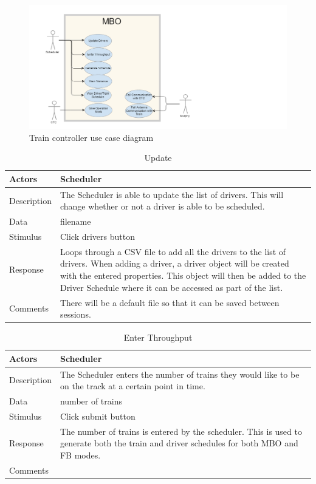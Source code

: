 \documentclass[]{article}
\begin{document}
\begin{figure}[H]
	\centering
	\includegraphics[scale=.2]{mbousecase.png}
	\caption{Train controller use case diagram}
\end{figure}
\begin{table}[H]
	\centering
	\caption{Update}
	\begin{tabular}{|l|l|}
		\hline
		Actors & \parbox[t]{10cm}{Scheduler} \\ \hline
		Description & \parbox[t]{10cm}{The Scheduler is able to update the list of drivers. This will change whether or not a driver is able to be scheduled.} \\ \hline
		Data &  \parbox[t]{10cm}{filename} \\ \hline
		Stimulus &  \parbox[t]{10cm}{Click drivers button} \\ \hline
		Response & \parbox[t]{10cm}{Loops through a CSV file to add all the drivers to the list of drivers. When adding a driver, a driver object will be created with the entered properties. This object will then be added to the Driver Schedule where it can be accessed as part of the list.}\\ \hline
		Comments & \parbox[t]{10cm}{There will be a default file so that it can be saved between sessions.}  \\ \hline
	\end{tabular}
\end{table}

\begin{table}[H]
	\centering
	\caption{Enter Throughput}
	\begin{tabular}{|l|l|}
		\hline
		Actors & \parbox[t]{10cm}{Scheduler} \\ \hline
		Description & \parbox[t]{10cm}{The Scheduler enters the number of trains they would like to be on the track at a certain point in time.} \\ \hline
		Data &  \parbox[t]{10cm}{number of trains} \\ \hline
		Stimulus &  \parbox[t]{10cm}{Click submit button} \\ \hline
		Response & \parbox[t]{10cm}{The number of trains is entered by the scheduler. This is used to generate both the train and driver schedules for both MBO and FB modes.}\\ \hline
		Comments & \parbox[t]{10cm}{}  \\ \hline
	\end{tabular}
\end{table}
\end{document}

